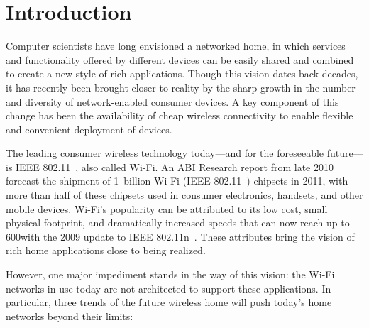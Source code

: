 \ifx\mainfile\undefined

\setcounter{chapter}{0} %
\fi

\cleardoublepage
\chapter{Introduction}
\label{chap:intro}

Computer scientists have long envisioned a networked home, in which services and functionality offered by different devices can be easily shared and combined to create a new style of rich applications. Though this vision dates back decades, it has recently been brought closer to reality by the sharp growth in the number and diversity of network-enabled consumer devices. A key component of this change has been the availability of cheap wireless connectivity to enable flexible and convenient deployment of devices.

The leading consumer wireless technology today---and for the foreseeable future---is IEEE 802.11~\cite{80211}, also called Wi-Fi. An ABI Research report from late 2010 forecast the shipment of 1~billion Wi-Fi (IEEE 802.11~\cite{80211}) chipsets in 2011, with more than half of these chipsets used in consumer electronics, handsets, and other mobile devices. Wi-Fi's popularity can be attributed to its low cost, small physical footprint, and dramatically increased speeds that can now reach up to 600\Mbps with the 2009 update to IEEE 802.11n~\cite{80211n}. These attributes bring the vision of rich home applications close to being realized.

However, one major impediment stands in the way of this vision: the Wi-Fi networks in use today are not architected to support these applications. In particular, three trends of the future wireless home will push today's home networks beyond their limits:


